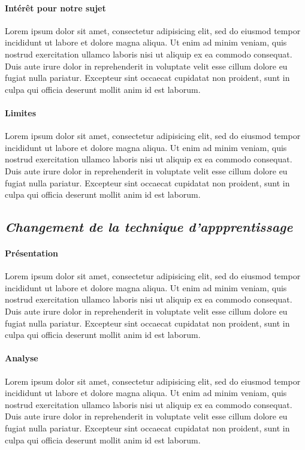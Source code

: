 \documentclass[11pt, french]{report-rd-info}
\begin{document}
\paragraph{Intérêt pour notre sujet }
Lorem ipsum dolor sit amet, consectetur adipisicing elit, sed do eiusmod tempor incididunt ut labore et dolore magna aliqua. Ut enim ad minim veniam, quis nostrud exercitation ullamco laboris nisi ut aliquip ex ea commodo consequat. Duis aute irure dolor in reprehenderit in voluptate velit esse cillum dolore eu fugiat nulla pariatur. Excepteur sint occaecat cupidatat non proident, sunt in culpa qui officia deserunt mollit anim id est laborum.

\paragraph{Limites }
Lorem ipsum dolor sit amet, consectetur adipisicing elit, sed do eiusmod tempor incididunt ut labore et dolore magna aliqua. Ut enim ad minim veniam, quis nostrud exercitation ullamco laboris nisi ut aliquip ex ea commodo consequat. Duis aute irure dolor in reprehenderit in voluptate velit esse cillum dolore eu fugiat nulla pariatur. Excepteur sint occaecat cupidatat non proident, sunt in culpa qui officia deserunt mollit anim id est laborum.

\subsection{\emph{Changement de la technique d’appprentissage}}

\paragraph{Présentation }
Lorem ipsum dolor sit amet, consectetur adipisicing elit, sed do eiusmod tempor incididunt ut labore et dolore magna aliqua. Ut enim ad minim veniam, quis nostrud exercitation ullamco laboris nisi ut aliquip ex ea commodo consequat. Duis aute irure dolor in reprehenderit in voluptate velit esse cillum dolore eu fugiat nulla pariatur. Excepteur sint occaecat cupidatat non proident, sunt in culpa qui officia deserunt mollit anim id est laborum.

\paragraph{Analyse }
Lorem ipsum dolor sit amet, consectetur adipisicing elit, sed do eiusmod tempor incididunt ut labore et dolore magna aliqua. Ut enim ad minim veniam, quis nostrud exercitation ullamco laboris nisi ut aliquip ex ea commodo consequat. Duis aute irure dolor in reprehenderit in voluptate velit esse cillum dolore eu fugiat nulla pariatur. Excepteur sint occaecat cupidatat non proident, sunt in culpa qui officia deserunt mollit anim id est laborum.
\end{document}
